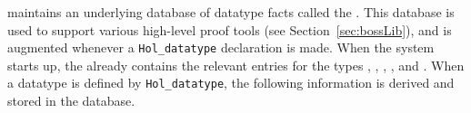 %
%
%
%
%
%
%
%

%
\HOL{} maintains an underlying database of datatype facts called the
.  This database is used to support various high-level
proof tools (see Section~\ref{sec:bossLib}), and is augmented whenever
a \verb+Hol_datatype+ declaration is made.  When the \HOL{} system
starts up, the  already contains the relevant entries for
the types , , , ,
and .  When a datatype is defined by \verb+Hol_datatype+,
the following information is derived and stored in the database.

